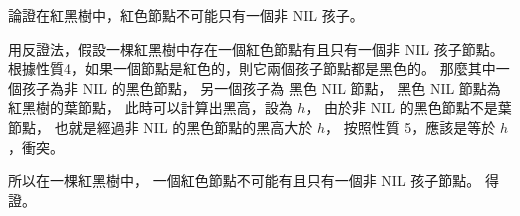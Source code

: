 \startEXERCISE
論證在紅黑樹中，紅色節點不可能只有一個非 NIL 孩子。
\stopEXERCISE

\startANSWER
用反證法，假設一棵紅黑樹中存在一個紅色節點有且只有一個非 NIL 孩子節點。
根據性質4，如果一個節點是紅色的，則它兩個孩子節點都是黑色的。
那麼其中一個孩子為非 NIL 的黑色節點，
另一個孩子為 黑色 NIL 節點，
黑色 NIL 節點為紅黑樹的葉節點，
此時可以計算出黑高，設為 $h$，
由於非 NIL 的黑色節點不是葉節點，
也就是經過非 NIL 的黑色節點的黑高大於 $h$，
按照性質 5，應該是等於 $h$，衝突。

所以在一棵紅黑樹中，
一個紅色節點不可能有且只有一個非 NIL 孩子節點。
得證。
\stopANSWER
